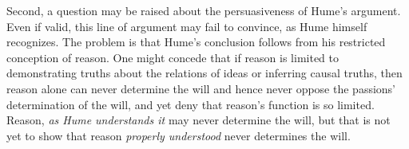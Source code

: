 Second, a question may be raised about the persuasiveness of Hume's argument. Even if valid, this line of argument may fail to convince, as Hume himself recognizes. The problem is that Hume's conclusion follows from his restricted conception of reason. One might concede that if reason is limited to demonstrating truths about the relations of ideas or inferring causal truths, then reason alone can never determine the will and hence never oppose the passions' determination of the will, and yet deny that reason's function is so limited. Reason, \emph{as Hume understands it} may never determine the will, but that is not yet to show that reason \emph{properly understood} never determines the will. \change

% 


